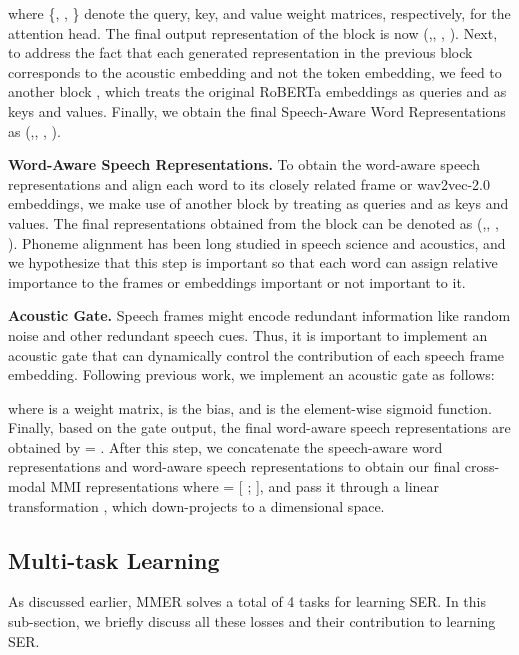 \documentclass{INTERSPEECH2023}
\begin{document}
where \{, , \}   denote the query, key, and value weight matrices, respectively, for the  attention head. The final output representation of the  block  is now   (,, , ). Next, to address the fact that each generated representation  in the previous block corresponds to the  acoustic embedding and not the token embedding, we feed  to another  block , which treats the original RoBERTa embeddings  as queries and  as keys and values. Finally, we obtain the final Speech-Aware Word Representations as   (,, , ).
\vspace{1mm}

{\noindent \textbf{Word-Aware Speech Representations.}} To obtain the word-aware speech representations and align each word to its closely related frame or wav2vec-2.0 embeddings, we make use of another  block  by treating  as queries and  as keys and values. The final representations obtained from the block can be denoted as   (,, , ). Phoneme alignment has been long studied in speech science and acoustics, and we hypothesize that this step is important so that each word can assign relative importance to the frames or embeddings important or not important to it.
\vspace{1mm}

{\noindent \textbf{Acoustic Gate.}} Speech frames might encode redundant information like random noise and other redundant speech cues. Thus, it is important to implement an acoustic gate  that can dynamically control the contribution of each speech frame embedding. Following previous work, we implement an acoustic gate  as follows:



where    is a weight matrix,    is the bias, and  is the element-wise sigmoid function. Finally, based on the gate output, the final word-aware speech representations are obtained by  = . After this step, we concatenate the speech-aware word representations and word-aware speech representations to obtain our final cross-modal MMI representations    where  = [ ; ], and pass it through a linear transformation , which down-projects  to a  dimensional space.

\subsection{Multi-task Learning}
As discussed earlier, MMER solves a total of 4 tasks for learning SER. In this sub-section, we briefly discuss all these losses and their contribution to learning SER.
\vspace{0.5mm}
\end{document}
